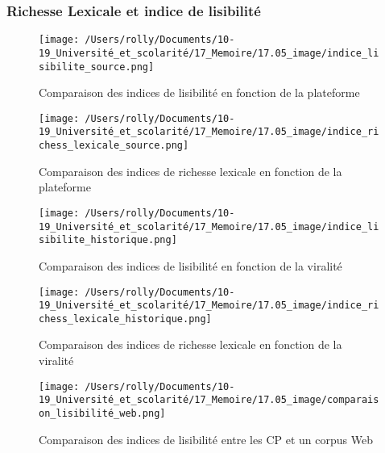 \documentclass[12pt,a4paper,oneside,titlepage]{article} %
\begin{document}
	
	\subsubsection*{Richesse Lexicale et indice de lisibilité}
	
	
	
	\begin{figure}
		\centering
		\begin{minipage}[b]{0.45\textwidth}
			\texttt{[image: /Users/rolly/Documents/10-19\_Université\_et\_scolarité/17\_Memoire/17.05\_image/indice\_lisibilite\_source.png]}
			\caption{Comparaison des indices de lisibilité en fonction de la plateforme}
			\label{fig:image1}
		\end{minipage}
		\hfill
		\begin{minipage}[b]{0.45\textwidth}
			\texttt{[image: /Users/rolly/Documents/10-19\_Université\_et\_scolarité/17\_Memoire/17.05\_image/indice\_richess\_lexicale\_source.png]}
			\caption{Comparaison des indices de richesse lexicale en fonction de la plateforme}
			\label{fig:image2}
		\end{minipage}
	\end{figure}
	\begin{figure}
		\centering
		\begin{minipage}[b]{0.45\textwidth}
			\texttt{[image: /Users/rolly/Documents/10-19\_Université\_et\_scolarité/17\_Memoire/17.05\_image/indice\_lisibilite\_historique.png]}
			\caption{Comparaison des indices de lisibilité en fonction de la viralité}
			\label{fig:image1}
		\end{minipage}
		\hfill
		\begin{minipage}[b]{0.45\textwidth}
			\texttt{[image: /Users/rolly/Documents/10-19\_Université\_et\_scolarité/17\_Memoire/17.05\_image/indice\_richess\_lexicale\_historique.png]}
			\caption{Comparaison des indices de richesse lexicale en fonction de la viralité}
			\label{fig:image2}
		\end{minipage}
	\end{figure}

\begin{figure}
	\texttt{[image: /Users/rolly/Documents/10-19\_Université\_et\_scolarité/17\_Memoire/17.05\_image/comparaison\_lisibilité\_web.png]}
	\caption{Comparaison des indices de lisibilité entre les CP et un corpus Web}
\end{figure}
\end{document}
